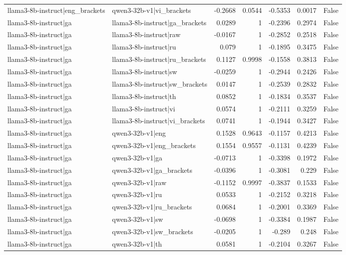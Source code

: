 \begin{table}
\begin{tabular}{l l r r r r l}
llama3-8b-instruct|eng_brackets & qwen3-32b-v1|vi_brackets & -0.2668 & 0.0544 & -0.5353 & 0.0017 & False \\
llama3-8b-instruct|ga & llama3-8b-instruct|ga_brackets & 0.0289 & 1 & -0.2396 & 0.2974 & False \\
llama3-8b-instruct|ga & llama3-8b-instruct|raw & -0.0167 & 1 & -0.2852 & 0.2518 & False \\
llama3-8b-instruct|ga & llama3-8b-instruct|ru & 0.079 & 1 & -0.1895 & 0.3475 & False \\
llama3-8b-instruct|ga & llama3-8b-instruct|ru_brackets & 0.1127 & 0.9998 & -0.1558 & 0.3813 & False \\
llama3-8b-instruct|ga & llama3-8b-instruct|sw & -0.0259 & 1 & -0.2944 & 0.2426 & False \\
llama3-8b-instruct|ga & llama3-8b-instruct|sw_brackets & 0.0147 & 1 & -0.2539 & 0.2832 & False \\
llama3-8b-instruct|ga & llama3-8b-instruct|th & 0.0852 & 1 & -0.1834 & 0.3537 & False \\
llama3-8b-instruct|ga & llama3-8b-instruct|vi & 0.0574 & 1 & -0.2111 & 0.3259 & False \\
llama3-8b-instruct|ga & llama3-8b-instruct|vi_brackets & 0.0741 & 1 & -0.1944 & 0.3427 & False \\
llama3-8b-instruct|ga & qwen3-32b-v1|eng & 0.1528 & 0.9643 & -0.1157 & 0.4213 & False \\
llama3-8b-instruct|ga & qwen3-32b-v1|eng_brackets & 0.1554 & 0.9557 & -0.1131 & 0.4239 & False \\
llama3-8b-instruct|ga & qwen3-32b-v1|ga & -0.0713 & 1 & -0.3398 & 0.1972 & False \\
llama3-8b-instruct|ga & qwen3-32b-v1|ga_brackets & -0.0396 & 1 & -0.3081 & 0.229 & False \\
llama3-8b-instruct|ga & qwen3-32b-v1|raw & -0.1152 & 0.9997 & -0.3837 & 0.1533 & False \\
llama3-8b-instruct|ga & qwen3-32b-v1|ru & 0.0533 & 1 & -0.2152 & 0.3218 & False \\
llama3-8b-instruct|ga & qwen3-32b-v1|ru_brackets & 0.0684 & 1 & -0.2001 & 0.3369 & False \\
llama3-8b-instruct|ga & qwen3-32b-v1|sw & -0.0698 & 1 & -0.3384 & 0.1987 & False \\
llama3-8b-instruct|ga & qwen3-32b-v1|sw_brackets & -0.0205 & 1 & -0.289 & 0.248 & False \\
llama3-8b-instruct|ga & qwen3-32b-v1|th & 0.0581 & 1 & -0.2104 & 0.3267 & False \\

\end{tabular}
\end{table}
